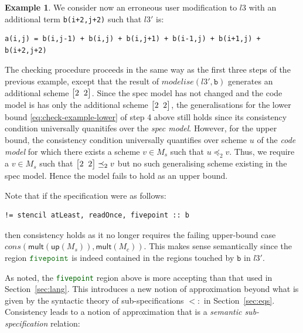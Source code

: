 \documentclass[9pt]{sigplanconf}
\newcounter{block}
\theoremstyle{definition}
\newtheorem{example}[block]{Example}
\newcommand{\term}[1]{\texttt{#1}}
\newcommand{\vtwoh}[2]{\setlength{\arraycolsep}{0em}
\left[\begin{array}{cc}#1 \; & \; #2\end{array}\right]}
\begin{document}
\begin{example} 
We consider now an erroneous user modification to $l3$ with an
additional term \texttt{b(i+2,j+2)} such that $l3'$ is:
%
\begin{verbatim}
a(i,j) = b(i,j-1) + b(i,j) + b(i,j+1) + b(i-1,j) + b(i+1,j) + b(i+2,j+2)
\end{verbatim}
%
The checking procedure proceeds in the same way as the first three
steps of the previous example, except that the result of
$\mathit{modelise}(l3',\texttt{b})$ generates an additional scheme
$\vtwoh{2}{2}$. Since the spec model has not changed and the code
model is has only the additional scheme $\vtwoh{2}{2}$, the generalisations for
the lower bound \eqref{eq:check-example-lower} 
of step 4 above still holds since its consistency condition
universally quanitifes over the \emph{spec model}. However, for
the upper bound, the consistency condition universally quantifies
over scheme $u$ of the \emph{code model} for which there exists
a scheme $v \in M_s$ such that $u \preceq_2 v$. Thus, we require a $v
\in M_s$ such that $\vtwoh{2}{2} \preceq_2 v$ but no such generalising
scheme existing in the spec model. Hence the model fails to hold as an upper bound.

Note that if the specification were as follows:
%
\begin{verbatim}
!= stencil atLeast, readOnce, fivepoint :: b
\end{verbatim}
%
then consistency holds as it no longer requires the failing upper-bound case 
$\mathit{cons}(\textsf{mult}(\textsf{up}(M_s)),\textsf{mult}(M_c))$.
 This makes sense semantically since the region ${\textcolor{darkgreen}{\texttt{fivepoint}}}$
is indeed contained in the regions touched by $\texttt{b}$ in $l3'$. 
\end{example}

As noted, the {\textcolor{darkgreen}{\term{fivepoint}}} region
 above is more accepting than that used in
Section~\ref{sec:lang}. This introduces a new notion of approximation
beyond what is given by the syntactic theory of sub-specifications
$<:$ in Section~\ref{sec:eqs}. Consistency leads to a notion of
approximation that is a \textit{semantic sub-specification} relation:
\end{document}
